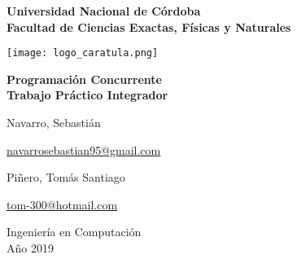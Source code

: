 \documentclass[12pt,a4paper]{article}
\renewcommand{\baselinestretch}{1} %
\begin{document}
\begin{titlepage}
    \begin{center}
        \vspace*{1cm}
        
        \Large
        \textbf{Universidad Nacional de Córdoba\\
        		Facultad de Ciencias Exactas, Físicas y Naturales}
        
        \vspace{0.5cm}
        \texttt{[image: logo\_caratula.png]}
        
        \vspace{1.5cm}
        
        \textbf{Programación Concurrente\\
        Trabajo Práctico Integrador}
        
        \vfill  
        
        \vspace{0.8cm}
        

        
        \Large
        Navarro, Sebastián\\
        
        \begin{large}
        \href{mailto:navarrosebastian95@gmail.com}{navarrosebastian95@gmail.com}\\
		\end{large} 
		
        Piñero, Tomás Santiago\\
        
        \begin{large}
        \href{mailto:tom-300@hotmail.com}{tom-300@hotmail.com}\\
		\end{large} 
		
        Ingeniería en Computación\\
        Año 2019\\
        
        
    \end{center}
\end{titlepage}

\setcounter{secnumdepth}{1}
\setcounter{tocdepth}{5}
\tableofcontents


\newpage
\renewcommand{\baselinestretch}{1}
\setlength{\parskip}{0.5em}
\end{document}
